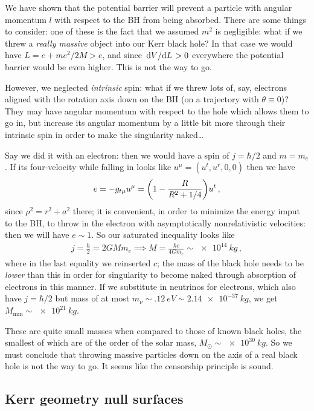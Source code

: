 \documentclass[main.tex]{subfiles}
\begin{document}
We have shown that the potential barrier will prevent a particle with angular momentum \(l\) with respect to the BH from being absorbed. 
There are some things to consider: one of these is the fact that we assumed \(m^2\) is negligible: what if we threw a \emph{really massive} object into our Kerr black hole?
In that case we would have \(L = e + m e^2 / 2M > e\), and since \(\dv*{V}{L} > 0\) everywhere the potential barrier would be even higher. This is not the way to go. 

However, we neglected \emph{intrinsic} spin: what if we threw lots of, say, electrons aligned with the rotation axis down on the BH (on a trajectory with \(\theta \equiv 0\))? 
They may have angular momentum with respect to the hole which allows them to go in, but increase its angular momentum by a little bit more through their intrinsic spin in order to make the singularity naked\dots

Say we did it with an electron: then we would have a spin of \(j= \hbar /2\) and \(m = m_e\). If its four-velocity while falling in looks like \(u^{\mu } = (u^{t}, u^{r}, 0,0)\) then we have 
%
\begin{align}
  e =- g_{t \mu } u^{\mu } = 
  \qty(1 - \frac{R}{R^2 + 1/4}) u^{t}
\,,
\end{align}
%
since \(\rho^2 = r^2 + a^2 \) there; it is convenient, in order to minimize the energy imput to the BH, to throw in the electron with asymptotically nonrelativistic velocities: then we will have \(e \sim 1\). So our saturated inequality looks like 
%
\begin{align}
  j = \frac{\hbar}{2}= 2GM m_e  \implies M = \frac{\hbar c}{4Gm_e} \sim \SI{e14}{kg}
\,,
\end{align}
%
where in the last equality we reinserted \(c\);
the mass of the black hole needs to be \emph{lower} than this in order for singularity to become naked through absorption of electrons in this manner.
If we substitute in neutrinos for electrons, which also have \(j = \hbar/2\) but mass of at most \(m_\nu \sim \SI{.12}{eV} \sim \SI{2.14e-37}{kg}\), we get \(M _{\text{min}} \sim \SI{e21}{kg}\). 

These are quite small masses when compared to those of known black holes, the smallest of which are of the order of the solar mass, \(M_{\odot} \sim \SI{e30}{kg}\).
So we must conclude that throwing massive particles down on the axis of a real black hole is not the way to go. 
It seems like the censorship principle is sound. 

\subsection{Kerr geometry null surfaces}
\end{document}
